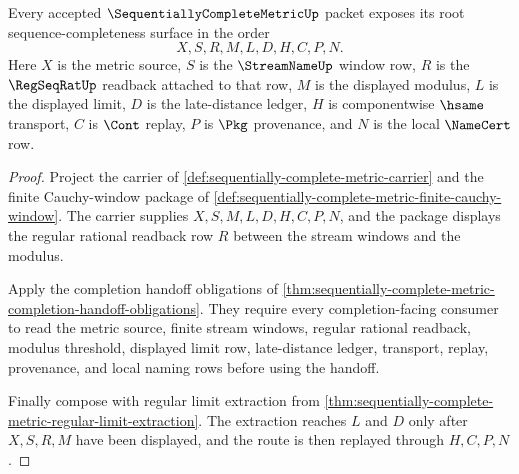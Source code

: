 \begin{theorem}
\label{thm:sequentially-complete-metric-display-route}
Every accepted $\SequentiallyCompleteMetricUp$ packet exposes its root sequence-completeness surface in the order
$$
X,S,R,M,L,D,H,C,P,N .
$$
Here $X$ is the metric source, $S$ is the $\StreamNameUp$ window row, $R$ is the $\RegSeqRatUp$ readback attached to that row, $M$ is the displayed modulus, $L$ is the displayed limit, $D$ is the late-distance ledger, $H$ is componentwise $\hsame$ transport, $C$ is $\Cont$ replay, $P$ is $\Pkg$ provenance, and $N$ is the local $\NameCert$ row.
\end{theorem}
\begin{proof}
Project the carrier of \autoref{def:sequentially-complete-metric-carrier} and the finite Cauchy-window package of \autoref{def:sequentially-complete-metric-finite-cauchy-window}. The carrier supplies $X,S,M,L,D,H,C,P,N$, and the package displays the regular rational readback row $R$ between the stream windows and the modulus.

Apply the completion handoff obligations of \autoref{thm:sequentially-complete-metric-completion-handoff-obligations}. They require every completion-facing consumer to read the metric source, finite stream windows, regular rational readback, modulus threshold, displayed limit row, late-distance ledger, transport, replay, provenance, and local naming rows before using the handoff.

Finally compose with regular limit extraction from \autoref{thm:sequentially-complete-metric-regular-limit-extraction}. The extraction reaches $L$ and $D$ only after $X,S,R,M$ have been displayed, and the route is then replayed through $H,C,P,N$.
\end{proof}

